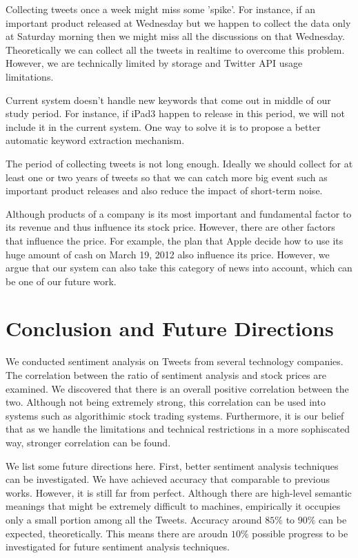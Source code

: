 \documentclass[12pt]{article}
\begin{document}
Collecting tweets once a week might miss some 'spike'. For instance, if an important product released at Wednesday but we happen to collect the data only at Saturday morning then we might miss all the discussions on that Wednesday. Theoretically we can collect all the tweets in realtime to overcome this problem. However, we are technically limited by storage and Twitter API usage limitations.

Current system doesn't handle new keywords that come out in middle of our study period. For instance, if iPad3 happen to release in this period, we will not include it in the current system. One way to solve it is to propose a better automatic keyword extraction mechanism.

The period of collecting tweets is not long enough. Ideally we should collect for at least one or two years of tweets so that we can catch more big event such as important product releases and also reduce the impact of short-term noise.

Although products of a company is its most important and fundamental factor to its revenue and thus influence its stock price. However, there are other factors that influence the price. For example, the plan that Apple decide how to use its huge amount of cash on March 19, 2012 also influence its price. However, we argue that our system can also take this category of news into account, which can be one of our future work.

\section{Conclusion and Future Directions}

We conducted sentiment analysis on Tweets from several technology companies. The correlation between the ratio of sentiment analysis and stock prices are examined. We discovered that there is an overall positive correlation between the two. Although not being extremely strong, this correlation can be used into systems such as algorithimic stock trading systems. Furthermore, it is our belief that as we handle the limitations and technical restrictions in a more sophiscated way, stronger correlation can be found.

We list some future directions here. First, better sentiment analysis techniques can be investigated. We have achieved accuracy that comparable to previous works. However, it is still far from perfect. Although there are high-level semantic meanings that might be extremely difficult to machines, empirically it occupies only a small portion among all the Tweets. Accuracy around $85\%$ to $90\%$ can be expected, theoretically. This means there are aroudn $10\%$ possible progress to be investigated for future sentiment analysis techniques.
\end{document}
